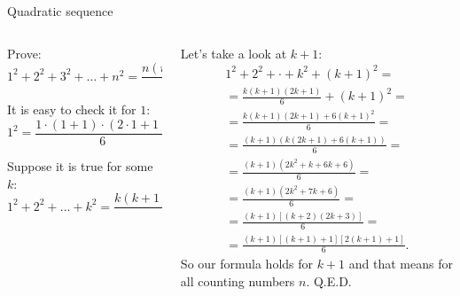 \documentclass[9pt,aspectratio=169]{beamer}
\begin{document}
\begin{frame}{Quadratic sequence}
  \begin{columns}[T]
    \begin{column}{0.5\textwidth}
      \begin{problem}
        Prove:
        \[
          1^2 + 2^2 + 3^2 + \dots + n^2 = \frac{n (n+1)(2n+1)}{6}.
        \]
      \end{problem}\pause
      It is easy to check it for $1$:
      \[ 1^2 = \frac{1 \cdot (1 + 1) \cdot (2 \cdot 1 + 1)}{6} = \frac{1 \cdot 2 \cdot 3}{6} = 1. \]\pause

      Suppose it is true for some $k$:
      \[
        1^2 + 2^2 + \dots + k^2 = \frac{k (k+1)(2k+1)}{6}.
      \]\pause
    \end{column}
    \begin{column}{0.5\textwidth}
      Let's take a look at $k+1$:
      \begin{multline*}
        1^2 + 2^2 + \cdot + k^2 + (k+1)^2 = \\
        = \frac{k (k+1)(2k+1)}{6} + (k + 1)^2 = \\
        = \frac{k (k + 1) (2k + 1) + 6(k + 1)^2}{6} = \\
        = \frac{(k+1)( k(2k + 1) + 6(k + 1))}{6} = \\
        = \frac{(k+1) ( 2k^2 + k + 6k + 6)}{6} = \\
        = \frac{(k+1) ( 2k^2 + 7k + 6)}{6} = \\
        = \frac{(k+1) [ (k + 2) (2k + 3) ]}{6} = \\
        = \frac{(k+1) [(k + 1) + 1] [2(k + 1) + 1]}{6}.
      \end{multline*}\pause
      So our formula holds for $k+1$ and that means for all counting numbers $n$. \hfill Q.E.D.
    \end{column}
  \end{columns}
\end{frame}
\end{document}

